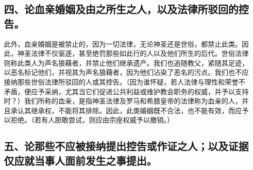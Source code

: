 
\subsection{四、论血亲婚姻及由之所生之人，以及法律所驳回的控告。}

此外，血亲婚姻是被禁止的，因为一切法律，无论神圣还是世俗，都禁止此类。因此，神圣法律不仅驱逐，甚至绝罚那些如此行的人以及他们所生的后代。世俗法律则称此类人为声名狼藉者，并禁止他们继承遗产。我们也追随教父，紧随其足迹，以恶名标记他们，并视其为声名狼藉者，因为他们沾染了恶名的污点。我们也不应接纳那些世俗法律所驳回的人或其控告。（因为谁怀疑，若人法律与理性和荣誉不矛盾，便应予采纳，尤其当它们促进公共利益或维护教会职务的权威，并予以支持时？）我们所称的血亲，是指神圣法律及罗马和希腊皇帝的法律称为血亲的人，并且承认其继承权，不能将其排除。因此，此类婚姻既不合法，也不能有效，而应予以拒绝。（若有人胆敢尝试，则应由宗座权威予以撤销。）\par


\subsection{五、论那些不应被接纳提出控告或作证之人；以及证据仅应就当事人面前发生之事提出。}

